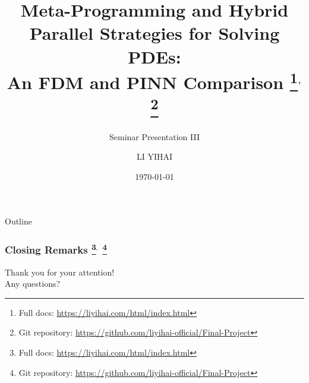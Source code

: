 \documentclass{my-Presentation}
\title[An FDM and PINN Comparison]{
  Meta-Programming and Hybrid Parallel Strategies for Solving PDEs: \\An FDM and PINN Comparison
  \footnote{Full docs: \url{https://liyihai.com/html/index.html}}$^{,}$
  \footnote{Git repository: \url{https://github.com/liyihai-official/Final-Project}}
}
\subtitle{Seminar Presentation III}
\author[LI Yihai]{
  \normalsize
  LI YIHAI \\[1ex]
  \vspace*{-.5em}
}
\institute[Mathematics Institute]{
  Student ID: 23345919 \\[1ex]
  Supervision: Michael Peardon
}
\date{\today \vspace*{-1em}}
\begin{document}
\begin{frame}
  \titlepage
\end{frame}

\begin{frame}{Outline}
  \begin{multicols}{2}
    \tableofcontents
  \end{multicols}
\end{frame}










  




\begin{frame}
  \frametitle{Closing Remarks
  \footnote{Full docs: \url{https://liyihai.com/html/index.html}}$^{,}$
  \footnote{Git repository: \url{https://github.com/liyihai-official/Final-Project}}
  }
  \centering
  {\Large Thank you for your attention!} \\
  \vspace{2em}
  {\large Any questions?}

\end{frame}


\end{document}
